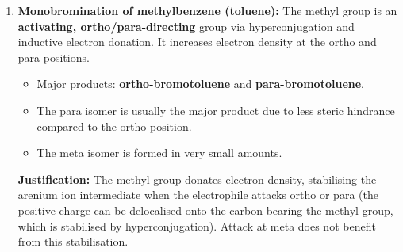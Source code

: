\documentclass[11pt]{article}
\begin{document}
\begin{corrige}
\begin{enumerate}
\item \textbf{Monobromination of methylbenzene (toluene):}
The methyl group is an \textbf{activating, ortho/para-directing} group via hyperconjugation and inductive electron donation. It increases electron density at the ortho and para positions.
\begin{itemize}
\item Major products: \textbf{ortho-bromotoluene} and \textbf{para-bromotoluene}.
\item The para isomer is usually the major product due to less steric hindrance compared to the ortho position.
\item The meta isomer is formed in very small amounts.
\end{itemize}
\textbf{Justification:} The methyl group donates electron density, stabilising the arenium ion intermediate when the electrophile attacks ortho or para (the positive charge can be delocalised onto the carbon bearing the methyl group, which is stabilised by hyperconjugation). Attack at meta does not benefit from this stabilisation.
\end{enumerate}
\end{corrige}
\end{document}

